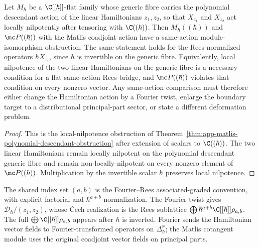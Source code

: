 \begin{cor}
\label{cor:app-matlis-same-action-interpolation-obstruction}
  Let \(M_\hbar\) be a \(\C[[\hbar]]\)-flat family whose generic fibre
  carries the polynomial descendant action of the linear Hamiltonians
  \(z_1,z_2\), so that \(X_{z_1}\) and \(X_{z_2}\) act locally
  nilpotently after tensoring with \(\C((\hbar))\).  Then
  \(M_\hbar((\hbar))\) and \(\mc P((\hbar))\) with the Matlis
  coadjoint action have a same-action module-isomorphism obstruction.
  The same statement holds for the Rees-normalized
  operators \(\hbar X_{z_i}\), since \(\hbar\) is invertible on the
  generic fibre.  Equivalently, local nilpotence of the two linear
  Hamiltonians on the generic fibre is a necessary condition for a flat
  same-action Rees bridge, and \(\mc P((\hbar))\) violates that condition
  on every nonzero vector.  Any same-action comparison must therefore
  either change the Hamiltonian action by a Fourier twist, enlarge the
  boundary target to a distributional principal-part sector, or state a
  different deformation problem.
\end{cor}

\begin{proof}
  This is the local-nilpotence obstruction of
  Theorem~\ref{thm:app-matlis-polynomial-descendant-obstruction} after extension
  of scalars to \(\C((\hbar))\).  The two linear Hamiltonians remain
  locally nilpotent on the polynomial descendant generic fibre and
  remain non-locally-nilpotent on every nonzero element of
  \(\mc P((\hbar))\).  Multiplication by the invertible scalar
  \(\hbar\) preserves local nilpotence.
\end{proof}

\begin{rmk}
\label{rmk:app-matlis-rees-bridge-scope}
  The shared index set \((a,b)\) is the Fourier--Rees
  associated-graded convention, with explicit factorial and
  \(\hbar^{a+b}\) normalization.  The Fourier twist gives
  \(\mathcal D_\hbar/(z_1,z_2)\), whose \v{C}ech realization is the Rees
  sublattice \(\bigoplus\hbar^{a+b}\C[[\hbar]]\rho_{a,b}\).  The full
  \(\bigoplus\C[[\hbar]]\rho_{a,b}\) appears after \(\hbar\) is inverted.
  Fourier sends the Hamiltonian vector fields to Fourier-transformed
  operators on \(\Delta^{\mathsf F}_\hbar\); the Matlis cotangent module
  uses the original coadjoint vector fields on principal parts.
\end{rmk}
